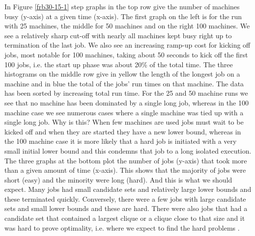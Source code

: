 \documentclass{l4proj}
\begin{document}
In Figure \ref{frb30-15-1} step graphs in the top row give the number of machines busy (y-axis) at a given time (x-axis). The first
graph on the left is for the run with 25 machines, the middle for 50 machines and on the right 100 machines. We see a relatively sharp cut-off
with nearly all machines kept busy  right up to termination of the last job. We also see an increasing ramp-up cost for kicking off jobs, 
most notable for 100 machines, taking about 50 seconds to kick off the first 100 jobs, i.e. the start up phase was about 20\% of the total time. 
The three histograms on the middle row give in yellow the length of the longest job on a machine and in
blue the total of the jobs' run times on that machine. The data has been sorted by increasing total run time. For the 25 and 50
machine runs we see that no machine has been dominated by a single long job, whereas in the 100 machine
case we see numerous cases where a single machine was tied up with a single long job. Why is this? When few machines are used
jobs must wait to be kicked off and when they are started they have a new lower bound, whereas in the 100 machine case
it is more likely that a hard job is initiated with a very small initial lower bound and this condemns that job to a long isolated 
execution. The three graphs at the bottom plot the number of jobs (y-axis) that took more than a given amount of time (x-axis).
This shows that the majority of jobs were short (easy) and the minority were long (hard). And this is what we should expect.
Many jobs had small candidate sets and relatively large lower bounds and these terminated quickly. Conversely, there were a few jobs with large
candidate sets and small lower bounds and these are hard. There were also jobs that had a candidate set that contained a largest clique 
or a clique close to that size and it was hard to prove optimality, i.e. where we expect to find the hard problems \cite{ckt,kappa}. 
\end{document}

